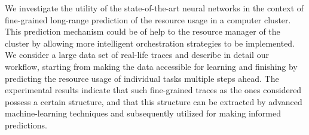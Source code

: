 We investigate the utility of the state-of-the-art neural networks in the
context of fine-grained long-range prediction of the resource usage in a
computer cluster. This prediction mechanism could be of help to the resource
manager of the cluster by allowing more intelligent orchestration strategies to
be implemented. We consider a large data set of real-life traces and describe in
detail our workflow, starting from making the data accessible for learning and
finishing by predicting the resource usage of individual tasks multiple steps
ahead. The experimental results indicate that such fine-grained traces as the
ones considered possess a certain structure, and that this structure can be
extracted by advanced machine-learning techniques and subsequently utilized for
making informed predictions.

